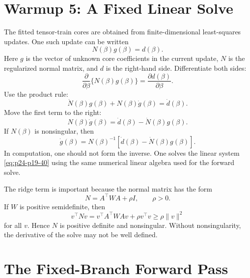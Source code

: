 \documentclass[11pt]{article}
\numberwithin{equation}{section}
\begin{document}
\section{Warmup 5: A Fixed Linear Solve}

The fitted tensor-train cores are obtained from finite-dimensional least-squares
updates.  One such update can be written
\begin{equation}
    N(\beta)g(\beta)=d(\beta).
    \label{eq:p24-p19-37}
\end{equation}
Here \(g\) is the vector of unknown core coefficients in the current update,
\(N\) is the regularized normal matrix, and \(d\) is the right-hand side.
Differentiate both sides:
\begin{equation}
    \frac{\partial}{\partial\beta}\{N(\beta)g(\beta)\}
    =
    \frac{\partial d(\beta)}{\partial\beta}.
    \label{eq:p24-p19-38}
\end{equation}
Use the product rule:
\begin{equation}
    \dot N(\beta)g(\beta)+N(\beta)\dot g(\beta)=\dot d(\beta).
    \label{eq:p24-p19-39}
\end{equation}
Move the first term to the right:
\begin{equation}
    N(\beta)\dot g(\beta)=\dot d(\beta)-\dot N(\beta)g(\beta).
    \label{eq:p24-p19-40}
\end{equation}
If \(N(\beta)\) is nonsingular, then
\begin{equation}
    \dot g(\beta)=
    N(\beta)^{-1}\left[\dot d(\beta)-\dot N(\beta)g(\beta)\right].
    \label{eq:p24-p19-41}
\end{equation}
In computation, one should not form the inverse.  One solves the linear system
\eqref{eq:p24-p19-40} using the same numerical linear algebra used for the forward solve.

The ridge term is important because the normal matrix has the form
\begin{equation}
    N=A^\top W A+\rho I,
    \qquad \rho>0.
    \label{eq:p24-p19-42}
\end{equation}
If \(W\) is positive semidefinite, then
\begin{equation}
    v^\top N v
    =
    v^\top A^\top W A v+\rho v^\top v
    \ge
    \rho\|v\|^2
    \label{eq:p24-p19-43}
\end{equation}
for all \(v\).  Hence \(N\) is positive definite and nonsingular.  Without
nonsingularity, the derivative of the solve may not be well defined.

\section{The Fixed-Branch Forward Pass}
\end{document}
